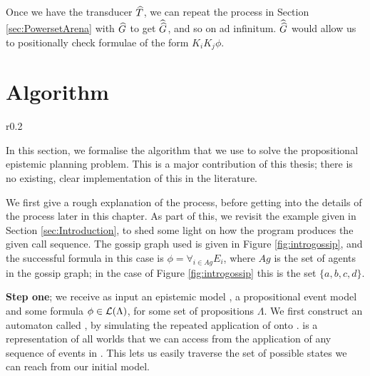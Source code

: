 \documentclass[ %
                    author={Leo Poulson},
                supervisor={Dr. Steven Ramsay},
                    degree={BSc},
                     title={Epistemic Planning for the Dynamic Gossip problem},
                  subtitle={},
                      year={2019} ]{dissertation}
\begin{document}
Once we have the transducer $\widehat{T}$, we can repeat the process in Section
\ref{sec:PowersetArena} with $\widehat{G}$ to get $\widehat{\widehat{G}}$, and so on ad
infinitum. $\widehat{\widehat{G}}$ would allow us to positionally check formulae of the
form $K_i K_j \phi$.

\newpage

\chapter{Algorithm}

\begin{wrapfigure}{r}{0.2\textwidth}
  \centering
  \caption{}
  \label{fig:introgossip}
\end{wrapfigure}

In this section, we formalise the algorithm that we use to solve the
propositional epistemic planning problem. This is a major contribution of this
thesis; there is no existing, clear implementation of this in the literature.

We first give a rough explanation of the process, before getting into the
details of the process later in this chapter. As part of this, we revisit the
example given in Section \ref{sec:Introduction}, to shed some light on how the
program produces the given call sequence. The gossip graph used is given in
Figure \ref{fig:introgossip}, and the successful formula in this case is $\phi =
\forall_{i \in Ag} E_i$, where $Ag$ is the set of agents in the gossip graph; in
the case of Figure \ref{fig:introgossip} this is the set $\{a, b, c, d\}$. 

\textbf{Step one}; we receive as input an epistemic model , a
propositional event model  and some formula $\phi \in \mathcal{L}(\Lambda)$,
for some set of propositions $\Lambda$. We first construct an automaton called
\mestar, by simulating the repeated application of  onto . \mestar
is a representation of all worlds that we can access from the application of any
sequence of events in . This lets us easily traverse the set of possible
states we can reach from our initial model.
\end{document}
